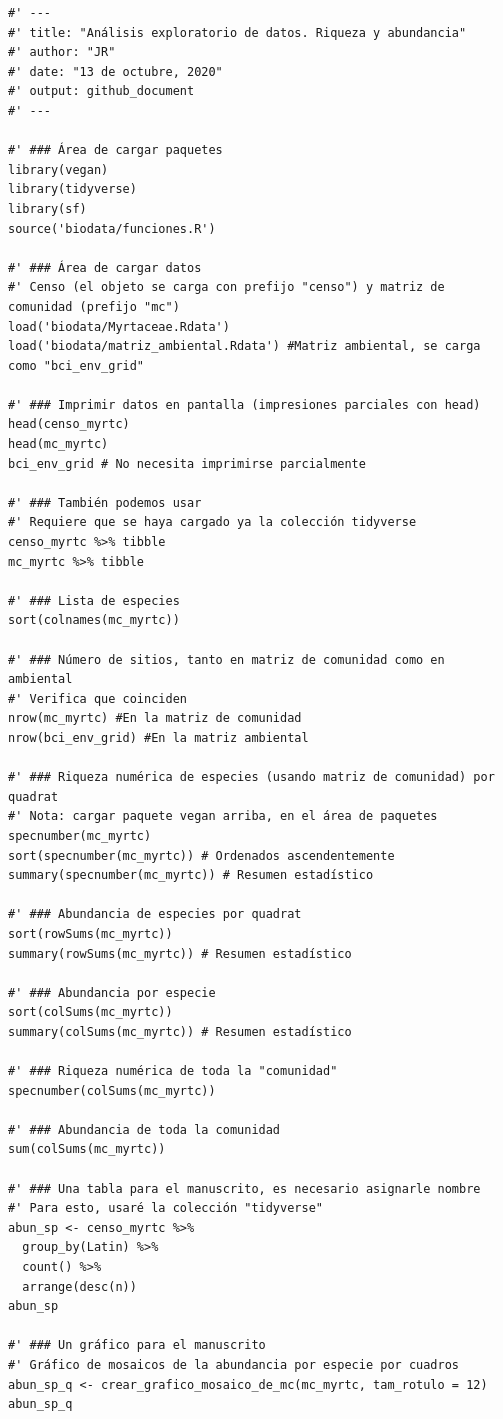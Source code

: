 \documentclass[11pt,]{article}
\begin{document}
\begin{verbatim}
#' ---
#' title: "Análisis exploratorio de datos. Riqueza y abundancia"
#' author: "JR"
#' date: "13 de octubre, 2020"
#' output: github_document
#' ---

#' ### Área de cargar paquetes
library(vegan)
library(tidyverse)
library(sf)
source('biodata/funciones.R')

#' ### Área de cargar datos
#' Censo (el objeto se carga con prefijo "censo") y matriz de comunidad (prefijo "mc")
load('biodata/Myrtaceae.Rdata')
load('biodata/matriz_ambiental.Rdata') #Matriz ambiental, se carga como "bci_env_grid"

#' ### Imprimir datos en pantalla (impresiones parciales con head)
head(censo_myrtc)
head(mc_myrtc)
bci_env_grid # No necesita imprimirse parcialmente

#' ### También podemos usar
#' Requiere que se haya cargado ya la colección tidyverse
censo_myrtc %>% tibble
mc_myrtc %>% tibble

#' ### Lista de especies
sort(colnames(mc_myrtc))

#' ### Número de sitios, tanto en matriz de comunidad como en ambiental
#' Verifica que coinciden
nrow(mc_myrtc) #En la matriz de comunidad
nrow(bci_env_grid) #En la matriz ambiental

#' ### Riqueza numérica de especies (usando matriz de comunidad) por quadrat
#' Nota: cargar paquete vegan arriba, en el área de paquetes
specnumber(mc_myrtc)
sort(specnumber(mc_myrtc)) # Ordenados ascendentemente
summary(specnumber(mc_myrtc)) # Resumen estadístico

#' ### Abundancia de especies por quadrat
sort(rowSums(mc_myrtc))
summary(rowSums(mc_myrtc)) # Resumen estadístico

#' ### Abundancia por especie
sort(colSums(mc_myrtc))
summary(colSums(mc_myrtc)) # Resumen estadístico

#' ### Riqueza numérica de toda la "comunidad"
specnumber(colSums(mc_myrtc))

#' ### Abundancia de toda la comunidad
sum(colSums(mc_myrtc))

#' ### Una tabla para el manuscrito, es necesario asignarle nombre
#' Para esto, usaré la colección "tidyverse"
abun_sp <- censo_myrtc %>%
  group_by(Latin) %>% 
  count() %>% 
  arrange(desc(n))
abun_sp

#' ### Un gráfico para el manuscrito
#' Gráfico de mosaicos de la abundancia por especie por cuadros
abun_sp_q <- crear_grafico_mosaico_de_mc(mc_myrtc, tam_rotulo = 12)
abun_sp_q
\end{verbatim}
\end{document}
